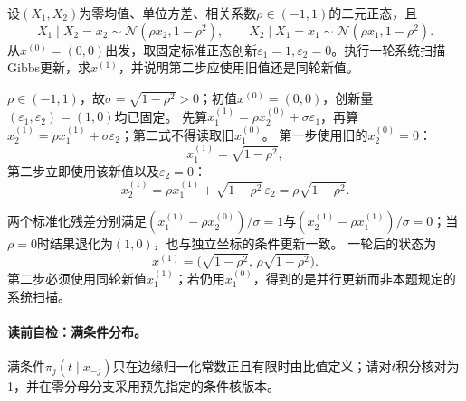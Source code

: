 \begin{example}\label{exm:V5-C04-bridge-bvn}
设$(X_1,X_2)$为零均值、单位方差、相关系数$\rho\in(-1,1)$的二元正态，且
\[
X_1\mid X_2=x_2\sim\mathcal N(\rho x_2,1-\rho^2),
\qquad
X_2\mid X_1=x_1\sim\mathcal N(\rho x_1,1-\rho^2).
\]
从$x^{(0)}=(0,0)$出发，取固定标准正态创新$\varepsilon_1=1,\varepsilon_2=0$。执行一轮系统扫描Gibbs更新，求$x^{(1)}$，并说明第二步应使用旧值还是同轮新值。
\end{example}
\begin{solution}
\SolGiven $\rho\in(-1,1)$，故$\sigma=\sqrt{1-\rho^2}>0$；初值$x^{(0)}=(0,0)$，创新量$(\varepsilon_1,\varepsilon_2)=(1,0)$均已固定。
\SolPlan 先算$x_1^{(1)}=\rho x_2^{(0)}+\sigma\varepsilon_1$，再算$x_2^{(1)}=\rho x_1^{(1)}+\sigma\varepsilon_2$；第二式不得读取旧$x_1^{(0)}$。
\SolDerive 第一步使用旧的$x_2^{(0)}=0$：
\[
x_1^{(1)}=\sqrt{1-\rho^2},
\]
第二步立即使用该新值以及$\varepsilon_2=0$：
\[
x_2^{(1)}
=\rho x_1^{(1)}+\sqrt{1-\rho^2}\,\varepsilon_2
=\rho\sqrt{1-\rho^2}.
\]

\SolCheck 两个标准化残差分别满足$(x_1^{(1)}-\rho x_2^{(0)})/\sigma=1$与$(x_2^{(1)}-\rho x_1^{(1)})/\sigma=0$；当$\rho=0$时结果退化为$(1,0)$，也与独立坐标的条件更新一致。
\SolAnswer 一轮后的状态为
\[
x^{(1)}=\bigl(\sqrt{1-\rho^2},\,\rho\sqrt{1-\rho^2}\bigr).
\]
第二步必须使用同轮新值$x_1^{(1)}$；若仍用$x_1^{(0)}$，得到的是并行更新而非本题规定的系统扫描。
\end{solution}

\label{struct:V5-C04-CH07}
\paragraph{读前自检：满条件分布。}满条件$\pi_j(t\mid x_{-j})$只在边缘归一化常数正且有限时由比值定义；请对$t$积分核对为1，并在零分母分支采用预先指定的条件核版本。\par

